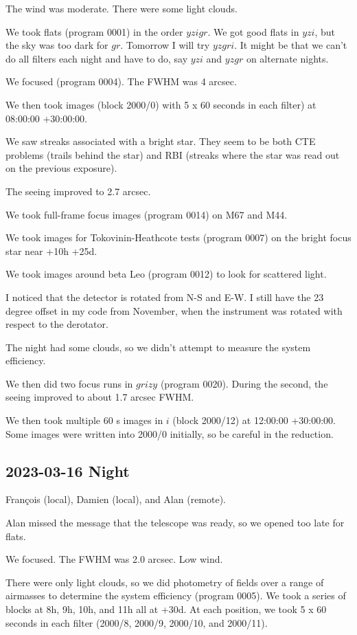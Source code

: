 \documentclass{article}
\begin{document}
The wind was moderate. There were some light clouds.

We took flats (program 0001) in the order $yzigr$. We got good flats in $yzi$, but the sky was too dark for $gr$. Tomorrow I will try $yzgri$. It might be that we can't do all filters each night and have to do, say $yzi$ and $yzgr$ on alternate nights.

We focused (program 0004). The FWHM was 4 arcsec.

We then took images (block 2000/0) with 5 x 60 seconds in each filter) at 08:00:00 +30:00:00.

We saw streaks associated with a bright star. They seem to be both CTE problems (trails behind the star) and RBI (streaks where the star was read out on the previous exposure).

The seeing improved to 2.7 arcsec.

We took full-frame focus images (program 0014) on M67 and M44.

We took images for Tokovinin-Heathcote tests (program 0007) on the bright focus star near +10h +25d.

We took images around beta Leo (program 0012) to look for scattered light.

I noticed that the detector is rotated from N-S and E-W. I still have the 23 degree offset in my code from November, when the instrument was rotated with respect to the derotator.

The night had some clouds, so we didn’t attempt to measure the system efficiency.

We then did two focus runs in $grizy$ (program 0020). During the second, the seeing improved to about 1.7 arcsec FWHM.

We then took multiple 60 s images in $i$ (block 2000/12) at 12:00:00 +30:00:00. Some images were written into 2000/0 initially, so be careful in the reduction.

\subsection{2023-03-16 Night}

François (local), Damien (local), and Alan (remote).

Alan missed the message that the telescope was ready, so we opened too late for flats.

We focused. The FWHM was 2.0 arcsec. Low wind.

There were only light clouds, so we did photometry of fields over a range of airmasses to determine the system efficiency (program 0005).
We took a series of blocks at 8h, 9h, 10h, and 11h all at +30d. At each position, we took 5 x 60 seconds in each filter (2000/8, 2000/9, 2000/10, and 2000/11).
\end{document}
